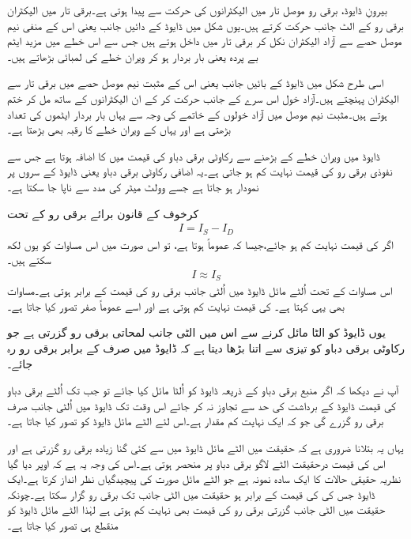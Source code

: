 بیرونِ ڈایوڈ، برقی رو موصل تار میں الیکٹرانوں کی حرکت سے پیدا ہوتی ہے۔برقی تار میں الیکٹران برقی رو  کے الٹ جانب حرکت کرتے ہیں۔یوں شکل میں ڈایوڈ کے دائیں جانب یعنی اس کے منفی نیم موصل حصے سے آزاد الیکٹران نکل کر برقی تار میں داخل ہوتے ہیں جس سے اس خطے میں مزید ایٹم  بے پردہ یعنی بار بردار ہو کر ویران خطے کی لمبائی بڑھاتے ہیں۔

اسی طرح شکل میں ڈایوڈ کے بائیں جانب یعنی اس کے مثبت نیم موصل حصے میں برقی تار سے الیکٹران پہنچتے ہیں۔آزاد خول اس سرے کے جانب حرکت کر کے ان الیکٹرانوں کے ساتھ مل کر ختم ہوتے ہیں۔مثبت نیم موصل میں آزاد خولوں کے خاتمے کی وجہ سے یہاں بار بردار ایٹموں کی تعداد بڑھتی ہے اور یہاں کے ویران خطے کا رقبہ بھی بڑھتا ہے۔

ڈایوڈ میں ویران خطے کے بڑھنے سے رکاوٹی برقی دباو کی قیمت میں  کا اضافہ ہوتا ہے جس سے نفوذی برقی رو  کی قیمت نہایت کم ہو جاتی ہے۔یہ اضافی رکاوٹی برقی دباو یعنی   ڈایوڈ کے سروں پر نمودار ہو جاتا ہے  جسے وولٹ میٹر کی مدد سے ناپا جا سکتا ہے۔

کرخوف کے قانون برائے برقی رو کے تحت 
\begin{align}
I=I_S-I_D
\end{align}
اگر  کی قیمت نہایت کم ہو جائے،جیسا کہ عموماً ہوتا ہے، تو اس صورت میں اس مساوات کو یوں لکھ سکتے ہیں۔
\begin{align}
I \approx I_S
\end{align}
اس مساوات کے تحت اُلٹے مائل ڈایوڈ میں اُلٹی جانب برقی رو کی قیمت  کے برابر ہوتی ہے۔مساوات   بھی یہی کہتا ہے۔ کی قیمت نہایت کم ہوتی ہے اور اسے عموماً صفر تصور کیا جاتا ہے۔

یوں ڈایوڈ کو الٹا مائل کرنے سے اس میں الٹی جانب لمحاتی برقی رو گزرتی ہے جو رکاوٹی برقی دباو کو تیزی سے اتنا بڑھا دیتا ہے کہ ڈایوڈ میں صرف   کے برابر برقی رو رہ جائے۔

آپ نے دیکھا کہ اگر منبع برقی دباو  کے ذریعہ ڈایوڈ کو اُلٹا مائل کیا جائے تو جب تک اُلٹے برقی دباو کی قیمت ڈایوڈ کے برداشت کی حد سے تجاوز نہ کر جائے اس وقت تک ڈایوڈ میں اُلٹی جانب صرف  برقی رو گزرے گی جو کہ ایک نہایت کم مقدار ہے۔اس لئے الٹے مائل  ڈایوڈ کو   تصور کیا جاتا ہے۔

یہاں یہ بتلانا ضروری ہے کہ حقیقت میں الٹے مائل  ڈایوڈ میں   سے کئی گنا زیادہ برقی رو گزرتی ہے اور اس کی قیمت درحقیقت الٹے لاگو برقی دباو پر منحصر ہوتی ہے۔اس کی وجہ یہ ہے کہ اوپر دیا گیا نظریہ حقیقی حالات کا ایک سادہ نمونہ ہے جو الٹے مائل صورت کی پیچیدگیاں نظر انداز کرتا ہے۔ایک ڈایوڈ جس کی  کی قیمت  کے برابر ہو حقیقت میں الٹی جانب    تک برقی رو گزار سکتا ہے۔چونکہ حقیقت میں الٹی جانب گزرتی برقی رو کی قیمت بھی نہایت کم ہوتی ہے لہٰذا الٹے مائل  ڈایوڈ کو منقطع ہی تصور کیا جاتا ہے۔


